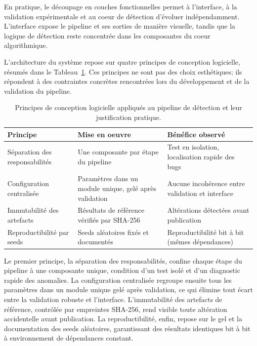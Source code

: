 En pratique, le découpage en couches fonctionnelles permet à l'interface, à la validation
expérimentale et au coeur de détection d'évoluer indépendamment. L'interface expose le pipeline et ses
sorties de manière visuelle, tandis que la logique de détection reste concentrée dans les
composantes du coeur algorithmique.

L'architecture du système repose sur quatre principes de conception logicielle, résumés
dans le Tableau~\ref{tab:principes_conception}. Ces principes ne sont pas des choix
esthétiques; ils répondent à des contraintes concrètes rencontrées lors du développement
et de la validation du pipeline.

\begin{table}[H]
    \centering
    \caption{Principes de conception logicielle appliqués au pipeline de détection
    et leur justification pratique.}
    \label{tab:principes_conception}
    \begin{tabular}{>{\raggedright\arraybackslash}p{3cm}
                    >{\raggedright\arraybackslash}p{4.5cm}
                    >{\raggedright\arraybackslash}p{5cm}}
        \toprule
        \textbf{Principe} & \textbf{Mise en oeuvre} & \textbf{Bénéfice observé} \\
        \midrule
        Séparation des responsabilités
        & Une composante par étape du pipeline
        & Test en isolation, localisation rapide des bugs \\
        \addlinespace
        Configuration centralisée
        & Paramètres dans un module unique, gelé après validation
        & Aucune incohérence entre validation et interface \\
        \addlinespace
        Immutabilité des artefacts
        & Résultats de référence vérifiés par SHA-256
        & Altérations détectées avant publication \\
        \addlinespace
        Reproductibilité par seeds
        & Seeds aléatoires fixés et documentés
        & Reproductibilité bit à bit (mêmes dépendances) \\
        \bottomrule
    \end{tabular}
\end{table}

Le premier principe, la séparation des responsabilités, confine chaque étape du pipeline à une
composante unique, condition d'un test isolé et d'un diagnostic rapide des anomalies. La
configuration centralisée regroupe ensuite tous les paramètres dans un module unique gelé après
validation, ce qui élimine tout écart entre la validation robuste et l'interface. L'immutabilité
des artefacts de référence, contrôlée par empreintes SHA-256, rend visible toute altération
accidentelle avant publication. La reproductibilité, enfin, repose sur le gel et la documentation
des seeds aléatoires, garantissant des résultats identiques bit à bit à environnement de
dépendances constant.


